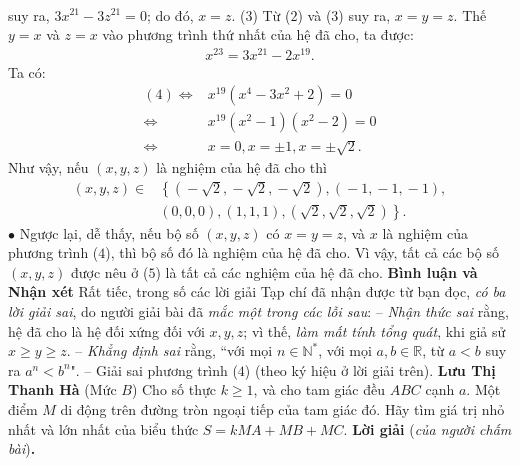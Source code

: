 \begin{multicols}{2}
\begin{align*}
	\end{align*}
	suy ra, $3{x^{21}} - 3{z^{21}} = 0$; do đó, $x = z$. \hfill ($3$)
	\vskip 0.05cm
	Từ ($2$) và ($3$) suy ra, $x = y = z$.
	\vskip 0.05cm
	Thế $y = x$ và $z = x$ vào phương trình thứ nhất của hệ đã cho, ta được:
	\begin{align*}
		{x^{23}} = 3{x^{21}} - 2{x^{19}}. \tag{$4$}
	\end{align*}
	Ta có:
	\begin{align*}
		(4) \Leftrightarrow& {x^{19}}\left( {{x^4} - 3{x^2} + 2} \right) = 0\\[-0.5ex]
			\Leftrightarrow &{x^{19}}\left( {{x^2} - 1} \right)\left( {{x^2} - 2} \right) = 0\\[-0.5ex]
			\Leftrightarrow & x = 0,x =  \pm 1,x =  \pm \sqrt 2 .
	\end{align*}
	Như vậy, nếu $(x, y, z)$ là nghiệm của hệ đã cho thì
	\begin{align*}
		\left( {x,y,z} \right) \in &\left\{\!\! \left( { \!-\! \sqrt 2 , \!-\! \sqrt 2 , \!-\! \sqrt 2 } \right)\!,\!\left( { \!-\! 1, \!-\! 1, \!-\! 1} \right)\!,\right.\\[-0.5ex]
		&\left.\left( {0,0,0} \right)\!,\!\left( {1,1,1} \right)\!,\!\left( {\sqrt 2 ,\sqrt 2 ,\sqrt 2 } \right)\!\! \right\}\!.
	\end{align*}
	$\bullet$ Ngược lại, dễ thấy, nếu bộ số $(x, y, z)$ có $x = y = z$, và $x$ là nghiệm của phương trình ($4$), thì bộ số đó là nghiệm của hệ đã cho.
	\vskip 0.05cm
	Vì vậy, tất cả các bộ số $(x, y, z)$ được nêu ở ($5$) là tất cả các nghiệm của hệ đã cho.
	\vskip 0.05cm
	\textbf{\color{thachthuctoanhoc}Bình luận và Nhận xét}
	\vskip 0.05cm
	Rất tiếc, trong số các lời giải Tạp chí đã nhận được từ bạn đọc, \textit{có ba lời giải sai}, do người giải bài đã \textit{mắc một trong các lỗi sau}:
	\vskip 0.05cm
	-- \textit{Nhận thức sai} rằng, hệ đã cho là hệ đối xứng đối với $x, y, z$; vì thế, \textit{làm mất tính tổng quát}, khi giả sử $x \ge y \ge z$.
	\vskip 0.05cm
	-- \textit{Khẳng định sai} rằng, ``với mọi $n \in \mathbb{N^*}$, với mọi $a,b \in \mathbb{R}$, từ $a < b$ suy ra $a^n < b^n$".
	\vskip 0.05cm
	-- Giải sai phương trình ($4$) (theo ký hiệu ở lời giải trên).
	\vskip 0.05cm
	\hfill \textbf{\color{thachthuctoanhoc}Lưu Thị Thanh Hà}
	\vskip 0.05cm
	{}
	(Mức $B$) Cho số thực $k\ge1$, và cho tam giác đều $ABC$ cạnh $a$. Một điểm $M$ di động trên đường tròn ngoại tiếp của tam giác đó. Hãy tìm giá trị nhỏ nhất và lớn nhất của biểu thức $S=kMA+MB+MC$.
	\vskip 0.05cm
	\textbf{\color{thachthuctoanhoc}Lời giải} (\textit{của người chấm bài})\textbf{\color{thachthuctoanhoc}.}

\end{multicols}
